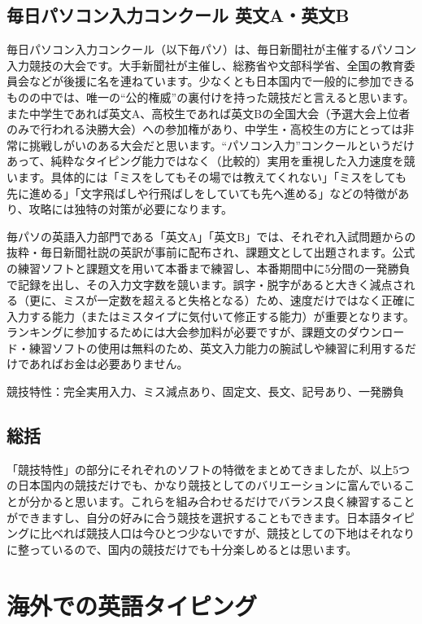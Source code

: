 \subsection{毎日パソコン入力コンクール 英文A・英文B}

毎日パソコン入力コンクール（以下毎パソ）は、毎日新聞社が主催するパソコン入力競技の大会です。大手新聞社が主催し、総務省や文部科学省、全国の教育委員会などが後援に名を連ねています。少なくとも日本国内で一般的に参加できるものの中では、唯一の“公的権威”の裏付けを持った競技だと言えると思います。また中学生であれば英文A、高校生であれば英文Bの全国大会（予選大会上位者のみで行われる決勝大会）への参加権があり、中学生・高校生の方にとっては非常に挑戦しがいのある大会だと思います。“パソコン入力”コンクールというだけあって、純粋なタイピング能力ではなく（比較的）実用を重視した入力速度を競います。具体的には「ミスをしてもその場では教えてくれない」「ミスをしても先に進める」「文字飛ばしや行飛ばしをしていても先へ進める」などの特徴があり、攻略には独特の対策が必要になります。

毎パソの英語入力部門である「英文A」「英文B」では、それぞれ入試問題からの抜粋・毎日新聞社説の英訳が事前に配布され、課題文として出題されます。公式の練習ソフトと課題文を用いて本番まで練習し、本番期間中に5分間の一発勝負で記録を出し、その入力文字数を競います。誤字・脱字があると大きく減点される（更に、ミスが一定数を超えると失格となる）ため、速度だけではなく正確に入力する能力（またはミスタイプに気付いて修正する能力）が重要となります。ランキングに参加するためには大会参加料が必要ですが、課題文のダウンロード・練習ソフトの使用は無料のため、英文入力能力の腕試しや練習に利用するだけであればお金は必要ありません。

競技特性：完全実用入力、ミス減点あり、固定文、長文、記号あり、一発勝負

\subsection{総括}

「競技特性」の部分にそれぞれのソフトの特徴をまとめてきましたが、以上5つの日本国内の競技だけでも、かなり競技としてのバリエーションに富んでいることが分かると思います。これらを組み合わせるだけでバランス良く練習することができますし、自分の好みに合う競技を選択することもできます。日本語タイピングに比べれば競技人口は今ひとつ少ないですが、競技としての下地はそれなりに整っているので、国内の競技だけでも十分楽しめるとは思います。

\section{海外での英語タイピング}

